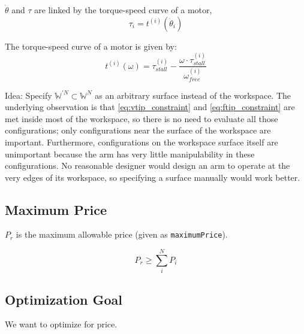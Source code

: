 \documentclass{article}
\begin{document}
$\dot{\theta}$ and $\tau$ are linked by the torque-speed curve of a motor,
\begin{equation}
    \tau_i = t^{(i)}(\dot{\theta}_i)
\end{equation}

The torque-speed curve of a motor is given by:
\begin{equation}
    t^{(i)}(\omega) = \tau_{stall}^{(i)} - \frac{\omega \cdot \tau_{stall}^{(i)}}{\omega_{free}^{(i)}}
\end{equation}

Idea: Specify $\mathbb{W}^{\prime N} \subset \mathbb{W}^N$ as an arbitrary surface instead of the
workspace. The underlying observation is that \ref{eq:vtip_constraint} and \ref{eq:ftip_constraint}
are met inside most of the workspace, so there is no need to evaluate all those configurations; only
configurations near the surface of the workspace are important. Furthermore, configurations on the
workspace surface itself are unimportant because the arm has very little manipulability in these
configurations. No reasonable designer would design an arm to operate at the very edges of its
workspace, so specifying a surface manually would work better.

\FloatBarrier
\subsection{Maximum Price}

$P_r$ is the maximum allowable price (given as \texttt{maximumPrice}).

\begin{equation}
    P_r \geq \sum_{i}^{N}{P_i}
\end{equation}

\FloatBarrier
\subsection{Optimization Goal}

We want to optimize for price.
\end{document}
